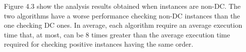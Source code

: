 \documentclass[a4paper,11pt]{article}
\begin{document}
% 
% 
% 
% 
% 
% 



Figure 4.3 show the analysis results obtained when instances are non-DC.
The two algorithms have a worse performance checking non-DC instances than the one checking DC ones. 
In average, each algorithm require an average execution time that, at most, can be 8 times greater than the average execution time required for checking positive instances having the same order.
\end{document}

